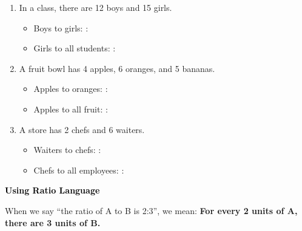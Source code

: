 \documentclass[12pt, letterpaper, fleqn]{article}
\newcommand{\blank}{\underline{\hspace{2.2cm}}}
\begin{document}
\begin{enumerate}[itemsep=1.5cm, leftmargin=0.6cm]

\item In a class, there are 12 boys and 15 girls.
\vspace{1cm}
\begin{itemize}
    \item Boys to girls: \blank : \blank
    \vspace{1cm}
    \item Girls to all students: \blank : \blank
\end{itemize}

\item A fruit bowl has 4 apples, 6 oranges, and 5 bananas.
\vspace{1cm}
\begin{itemize}
    \item Apples to oranges: \blank : \blank
    \vspace{1cm}
    \item Apples to all fruit: \blank : \blank
\end{itemize}

\item A store has 2 chefs and 6 waiters.
\vspace{1cm}
\begin{itemize}
    \item Waiters to chefs: \blank : \blank
    \vspace{1cm}
    \item Chefs to all employees: \blank : \blank
\end{itemize}

\end{enumerate}

\newpage

\begin{tcolorbox}[colback=customteal!20]
\large\textcolor{black}{\textbf{Using Ratio Language}}
\end{tcolorbox}

\noindent
When we say ``the ratio of A to B is 2:3'', we mean: \textbf{For every 2 units of A, there are 3 units of B.}

\vspace{3mm}
\end{document}
